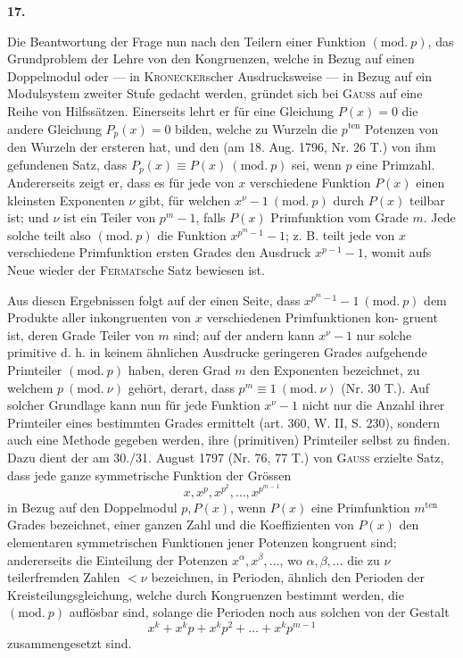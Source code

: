 \begin{center}\bfseries 17.\end{center}
\noindent\hspace*{\parindent}Die Beantwortung der Frage nun nach den Teilern einer Funktion \((\mathrm{mod.}\ p)\), das Grundproblem der Lehre von den Kongruenzen, welche in Bezug auf einen Doppelmodul oder — in \textsc{Kronecker}scher Ausdrucksweise — in Bezug auf ein Modulsystem zweiter Stufe gedacht werden, gründet sich bei \textsc{Gauss} auf eine Reihe von Hilfssätzen. Einerseits lehrt er für eine Gleichung \(P(x)=0\) die andere Gleichung \(P_p(x)=0\) bilden, welche zu Wurzeln die \(p^{\mathrm{ten}}\) Potenzen von den Wurzeln der ersteren hat, und den (am 18. Aug. 1796, Nr. 26 T.) von ihm gefundenen Satz, dass \(P_p(x)\equiv P(x)\ (\mathrm{mod.}\ p)\) sei, wenn \(p\) eine Primzahl. Andererseits zeigt er, dass es für jede von \(x\) verschiedene Funktion \(P(x)\) einen kleinsten Exponenten \(\nu\) gibt, für welchen \(x^\nu-1\ (\mathrm{mod.}\ p)\) durch \(P(x)\) teilbar ist; und \(\nu\) ist ein Teiler von \(p^m-1\), falls \(P(x)\) Primfunktion vom Grade \(m\). Jede solche teilt also \((\mathrm{mod.}\ p)\) die Funktion \(x^{p^m-1}-1\); z. B. teilt jede von \(x\) verschiedene Primfunktion ersten Grades den Ausdruck \(x^{p-1}-1\), womit aufs Neue wieder der \textsc{Fermat}sche Satz bewiesen ist.

Aus diesen Ergebnissen folgt auf der einen Seite, dass \(x^{p^m-1}-1\ (\mathrm{mod.}\ p)\) dem Produkte aller inkongruenten von \(x\) verschiedenen Primfunktionen kon-
\newpage{}
\noindent gruent ist, deren Grade Teiler von \(m\) sind; auf der andern kann \(x^\nu-1\) nur solche primitive d. h. in keinem ähnlichen Ausdrucke geringeren Grades aufgehende Primteiler \((\mathrm{mod.}\ p)\) haben, deren Grad \(m\) den Exponenten bezeichnet, zu welchem \(p\ (\mathrm{mod.}\ \nu)\) gehört, derart, dass \(p^m\equiv1\ (\mathrm{mod.}\ \nu)\) (Nr. 30 T.). Auf solcher Grundlage kann nun für jede Funktion \(x^\nu-1\) nicht nur die Anzahl ihrer Primteiler eines bestimmten Grades ermittelt (art. 360, W. II, S. 230), sondern auch eine Methode gegeben werden, ihre (primitiven) Primteiler selbst zu finden. Dazu dient der am 30./31. August 1797 (Nr. 76, 77 T.) von \textsc{Gauss} erzielte Satz, dass jede ganze symmetrische Funktion der Grössen
\[
x,x^p,x^{p^2},\ldots,x^{p^{m-1}}
\]
in Bezug auf den Doppelmodul \(p,P(x)\), wenn \(P(x)\) eine Primfunktion \(m^{\mathrm{ten}}\) Grades bezeichnet, einer ganzen Zahl und die Koeffizienten von \(P(x)\) den elementaren symmetrischen Funktionen jener Potenzen kongruent sind; andererseits die Einteilung der Potenzen \(x^\alpha,x^\beta,\ldots\), wo \(\alpha,\beta,\ldots\) die zu \(\nu\) teilerfremden Zahlen \(<\nu\) bezeichnen, in Perioden, ähnlich den Perioden der Kreisteilungsgleichung, welche durch Kongruenzen bestimmt werden, die \((\mathrm{mod.}\ p)\) auflösbar sind, solange die Perioden noch aus solchen von der Gestalt
\[
x^k+x^kp+x^kp^2+\ldots+x^kp^{m-1}
\]
zusammengesetzt sind.

